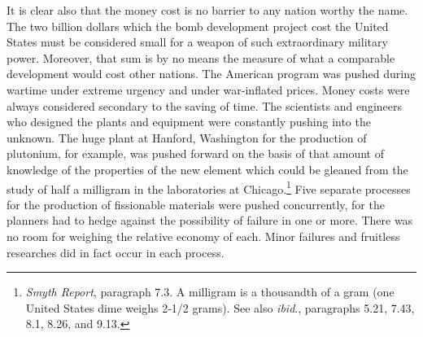 It is clear also that the money cost is no barrier to any nation worthy the name. The two billion dollars which the bomb development project cost the United States must be considered small for a weapon of such extraordinary military power. Moreover, that sum is by no means the measure of what a comparable development would cost other nations. The American program was pushed during wartime under extreme urgency and under war-inflated prices. Money costs were always considered secondary to the saving of time. The scientists and engineers who designed the plants and equipment were constantly pushing into the unknown. The huge plant at Hanford, Washington for the production of plutonium, for example, was pushed forward on the basis of that amount of knowledge of the properties of the new element which could be gleaned from the study of half a milligram in the laboratories at Chicago.\footnote{\emph{Smyth Report}, paragraph 7.3. A milligram is a thousandth of a gram (one United States dime weighs 2-1/2 grams). See also \emph{ibid}., paragraphs 5.21, 7.43, 8.1, 8.26, and 9.13.} Five separate processes for the production of fissionable materials were pushed concurrently, for the planners had to hedge against the possibility of failure in one or more. There was no room for weighing the relative economy of each. Minor failures and fruitless researches did in fact occur in each process.

